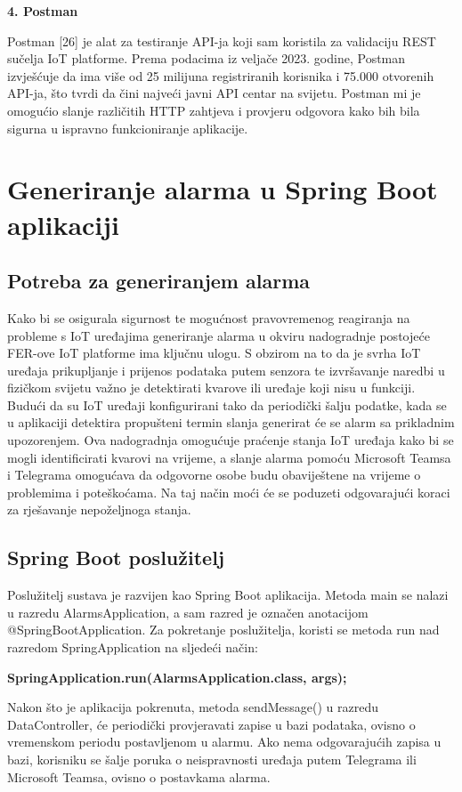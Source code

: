 \documentclass[times, utf8, zavrsni]{fer}
\begin{document}
\textbf{4. Postman}

Postman [26] je alat za testiranje API-ja koji sam koristila za validaciju REST sučelja IoT platforme. Prema podacima iz veljače 2023. godine, Postman izvješćuje da ima više od 25 milijuna registriranih korisnika i 75.000 otvorenih API-ja, što tvrdi da čini najveći javni API centar na svijetu. Postman mi je omogućio slanje različitih HTTP zahtjeva i provjeru odgovora kako bih bila sigurna u ispravno funkcioniranje aplikacije.

\chapter{ Generiranje alarma u Spring Boot aplikaciji}
\section{ Potreba za generiranjem alarma}
Kako bi se osigurala sigurnost te mogućnost pravovremenog reagiranja na probleme s IoT uređajima generiranje alarma u okviru nadogradnje postojeće FER-ove IoT platforme ima ključnu ulogu. S obzirom na to da je svrha IoT uređaja  prikupljanje i prijenos podataka putem senzora te izvršavanje naredbi u fizičkom svijetu važno je detektirati kvarove ili uređaje koji nisu u funkciji. Budući da su IoT uređaji konfigurirani tako da periodički šalju podatke, kada se u aplikaciji detektira propušteni termin slanja generirat će se alarm sa prikladnim upozorenjem. Ova nadogradnja omogućuje praćenje stanja IoT uređaja kako bi se mogli identificirati kvarovi na vrijeme, a slanje alarma pomoću Microsoft Teamsa i Telegrama omogućava da odgovorne osobe budu obaviještene na vrijeme o problemima i poteškoćama. Na taj način moći će se poduzeti odgovarajući koraci za rješavanje nepoželjnoga stanja.

\section{Spring Boot poslužitelj}
   Poslužitelj sustava je razvijen kao Spring Boot aplikacija. Metoda main se nalazi u razredu {\selectfont AlarmsApplication}, a sam razred je označen anotacijom @SpringBootApplication. Za pokretanje poslužitelja, koristi se metoda run nad razredom {\selectfont SpringApplication} na sljedeći način:

 \textbf{ SpringApplication.run(AlarmsApplication.class, args);}

 Nakon što je aplikacija pokrenuta, metoda {\selectfont sendMessage()} u razredu {\selectfont DataController}, će periodički provjeravati zapise u bazi podataka, ovisno o vremenskom periodu postavljenom u alarmu. Ako nema odgovarajućih zapisa u bazi, korisniku se šalje poruka o neispravnosti uređaja putem Telegrama ili Microsoft Teamsa, ovisno o postavkama alarma. 
\end{document}
